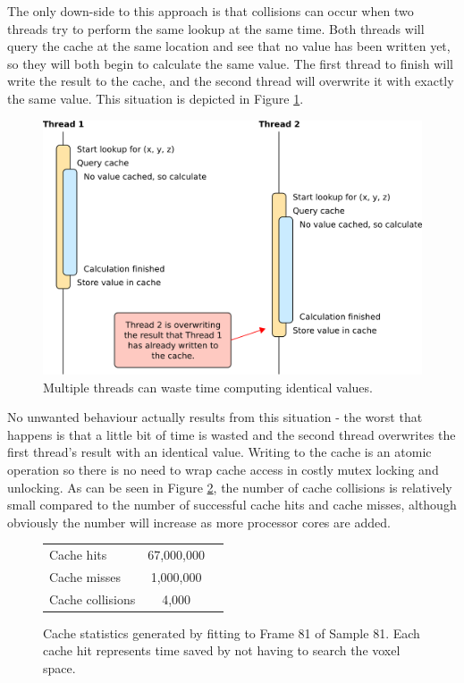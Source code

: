 The only down-side to this approach is that collisions can occur when two threads try to perform the same lookup at the same time.
Both threads will query the cache at the same location and see that no value has been written yet, so they will both begin to calculate the same value.
The first thread to finish will write the result to the cache, and the second thread will overwrite it with exactly the same value.
This situation is depicted in Figure \ref{CacheCollisions}.

\begin{figure}[tb]
	\centering
	\includegraphics[width=\textwidth]{cachecollisions.png}
	\caption{Multiple threads can waste time computing identical values.}
	\label{CacheCollisions}
\end{figure}

No unwanted behaviour actually results from this situation - the worst that happens is that a little bit of time is wasted and the second thread overwrites the first thread's result with an identical value.
Writing to the cache is an atomic operation so there is no need to wrap cache access in costly mutex locking and unlocking.
As can be seen in Figure \ref{CacheStatsTable}, the number of cache collisions is relatively small compared to the number of successful cache hits and cache misses, although obviously the number will increase as more processor cores are added.

\begin{figure}[thb]
	\begin{center}
		\begin{tabular}{|l|c|c|}
			\hline
			Cache hits & 67,000,000 \\
			Cache misses & 1,000,000 \\
			Cache collisions & 4,000 \\
			\hline
		\end{tabular}
	\end{center}
	\caption{Cache statistics generated by fitting to Frame 81 of Sample 81.
		Each cache hit represents time saved by not having to search the voxel space.}
	\label{CacheStatsTable}
\end{figure}

